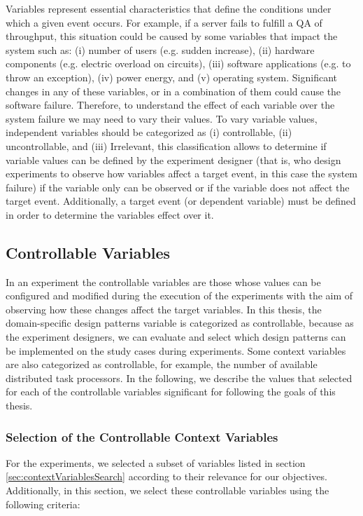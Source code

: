 Variables represent essential characteristics that define the conditions under which a given event occurs. For example, if a server fails to fulfill a QA of throughput, this situation could be caused by some variables that impact the system such as: (i) number of users (e.g. sudden increase), (ii) hardware components (e.g. electric overload on circuits), (iii) software applications (e.g. to throw an exception), (iv) power energy, and (v) operating system. Significant changes in any of these variables, or in a combination of them could cause the software failure. Therefore, to understand the effect of each variable over the system failure we may need to vary their values. To vary variable values, independent variables should be categorized as (i) controllable,  (ii) uncontrollable, and (iii) Irrelevant, this classification allows to determine if variable values can be defined by the experiment designer (that is, who design experiments to observe how variables affect a target event, in this case the system failure) if the variable only can be observed or if the variable does not affect the target event. Additionally, a target event (or dependent variable) must be defined in order to determine the variables effect over it.

\subsection{Controllable Variables}

In an experiment the controllable variables are those whose values can be configured and modified during the execution of the experiments with the aim of observing how these changes affect the target variables. In this thesis, the domain-specific design patterns variable is categorized as controllable, because as the experiment designers, we can evaluate and select which design patterns can be implemented on the study cases during experiments. Some context variables are also categorized as controllable, for example, the number of available distributed task processors. In the following, we describe the values that selected for each of the controllable variables significant for following the goals of this thesis.

\subsubsection{Selection of the Controllable Context Variables}
\label{sec:contextVariablesControlledSelection}
For the experiments, we selected a subset of variables listed in section \ref{sec:contextVariablesSearch} according to their relevance for our objectives. Additionally, in this section, we select these controllable variables using the following criteria:

